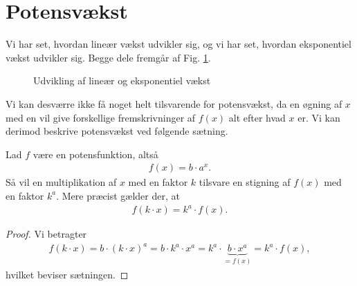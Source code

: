 \section*{Potensvækst}
Vi har set, hvordan lineær vækst udvikler sig, og vi har set, hvordan eksponentiel vækst udvikler sig. Begge dele fremgår af Fig. \ref{fig:lineks}.
\begin{figure}[H]
\centering
{}
\caption{Udvikling af lineær og eksponentiel vækst}
\label{fig:lineks}
\end{figure}
Vi kan desværre ikke få noget helt tilsvarende for potensvækst, da en øgning af $x$ med en vil give forskellige fremskrivninger af $f(x)$ alt efter hvad $x$ er. Vi kan derimod beskrive potensvækst ved følgende sætning.
\begin{setn}
Lad $f$ være en potensfunktion, altså 
\begin{align*}
f(x) = b\cdot a^x.
\end{align*}
Så vil en multiplikation af $x$ med en faktor $k$ tilsvare en stigning af $f(x)$ med en faktor $k^a$. Mere præcist gælder der, at 
\begin{align*}
f(k\cdot x) = k^a\cdot f(x).
\end{align*}
\end{setn}
\begin{proof}
Vi betragter 
\begin{align*}
f(k\cdot x) = b\cdot (k\cdot x)^a = b \cdot k^a \cdot x^a = k^a\cdot\underbrace{b\cdot x^a}_{=f(x)} = k^a \cdot f(x),
\end{align*}
hvilket beviser sætningen. 
\end{proof}
